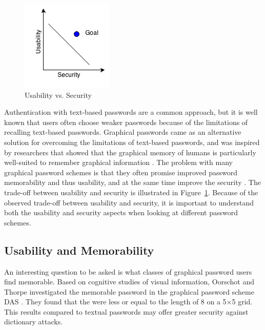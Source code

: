   \begin{figure}
    \vspace{-20pt}
    \begin{center}
      \includegraphics[scale=0.7]{pics/UsabilityVsSecurity.png}
    \end{center}
    \vspace{-20pt}
    \caption{Usability vs. Security}
    \vspace{-10pt}
    \label{fig:usabilitysecurity}
  \end{figure}

  Authentication with text-based passwords are a common approach, but it is well known that users often choose weaker passwords because of the limitations of recalling text-based passwords. Graphical passwords came as an alternative solution for overcoming the limitations of text-based passwords, and was inspired by researchers that showed that the graphical memory of humans is particularly well-suited to remember graphical information \cite{DeAngeli}. The problem with many graphical password schemes is that they often promise improved password memorability and thus usability, and at the same time improve the security \cite{Biddle}. The trade-off between usability and security is illustrated in Figure~\ref{fig:usabilitysecurity}. Because of the observed trade-off between usability and security, it is important to understand both the usability and security aspects when looking at different password schemes.

\subsection{Usability and Memorability}


  An interesting question to be asked is what classes of graphical password users find memorable. Based on cognitive studies of visual information, Oorschot and Thorpe \cite{Thorpe1} investigated the memorable password in the graphical password scheme DAS \cite{Jermyn}. They found that the were less or equal to the length of 8 on a 5$\times$5 grid. This results compared to textual passwords may offer greater security against dictionary attacks.

